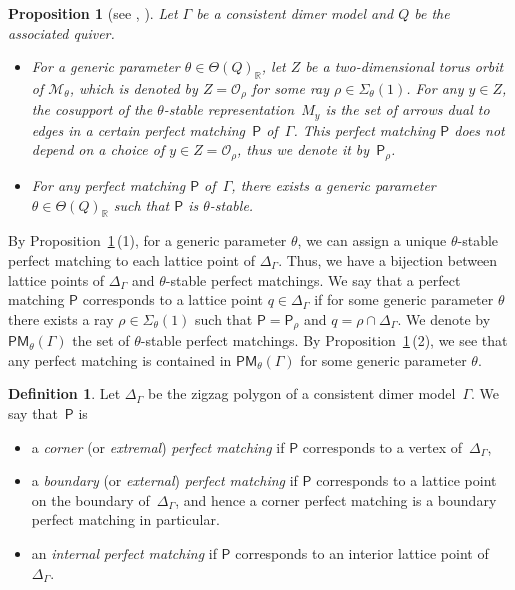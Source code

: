 \documentclass[10pt,a4paper]{amsart}
\numberwithin{equation}{section}
\newtheorem{Proposition}[Theorem]{Proposition}
\theoremstyle{definition}
\newtheorem{Definition}[Theorem]{Definition}
\newcommand{\RR}{\mathbb{R}}
\newcommand{\calM}{\mathcal{M}}
\newcommand{\calO}{\mathcal{O}}
\newcommand{\sfP}{\mathsf{P}}
\newcommand{\PM}{\mathsf{PM}}
\begin{document}
\begin{Proposition}[{see \cite[Section~6]{IU_moduli}, \cite[Proposition~4.15]{Moz}}]
\label{corresp_pm}
Let $\Gamma$ be a consistent dimer model and $Q$ be the associated quiver.
\begin{itemize}\itemsep=0pt
\item[$(1)$] For a generic parameter $\theta\in\Theta(Q)_\RR$,
let $Z$ be a two-dimensional torus orbit of $\calM_\theta$, which is denoted by $Z=\calO_\rho$ for some ray $\rho\in\Sigma_\theta(1)$.
For any $y\in Z$, the cosupport of the $\theta$-stable representation~$M_y$ is the set of arrows dual to edges in
a certain perfect matching~$\sfP$ of~$\Gamma$.
This perfect matching $\sfP$ does not depend on a choice of $y\in Z=\calO_\rho$, thus we denote it by~$\sfP_\rho$.
\item[$(2)$]
For any perfect matching $\sfP$ of~$\Gamma$, there exists a generic parameter $\theta\in\Theta(Q)_\RR$ such that $\sfP$ is $\theta$-stable.
\end{itemize}
\end{Proposition}

By Proposition~\ref{corresp_pm}\,(1), for a generic parameter $\theta$,
we can assign a unique $\theta$-stable perfect matching to each lattice point of $\Delta_\Gamma$.
Thus, we have a bijection between lattice points of $\Delta_\Gamma$ and $\theta$-stable perfect matchings.
We say that a perfect matching $\sfP$ corresponds to a lattice point $q\in\Delta_\Gamma$
if for some generic parameter $\theta$ there exists a ray $\rho\in\Sigma_\theta(1)$ such that $\sfP=\sfP_\rho$ and $q=\rho\cap \Delta_\Gamma$.
We denote by $\PM_\theta(\Gamma)$ the set of $\theta$-stable perfect matchings.
By Proposition~\ref{corresp_pm}\,(2), we see that any perfect matching is contained in $\PM_\theta(\Gamma)$ for some generic parameter $\theta$.

\begin{Definition}
Let $\Delta_\Gamma$ be the zigzag polygon of a consistent dimer model~$\Gamma$.
We say that~$\sfP$ is
\begin{itemize}\itemsep=0pt
\item a \emph{corner} (or \emph{extremal}) \emph{perfect matching} if $\sfP$ corresponds to a vertex of~$\Delta_\Gamma$,
\item a \emph{boundary} (or \emph{external}) \emph{perfect matching} if $\sfP$ corresponds to a lattice point on the boundary of~$\Delta_\Gamma$,
and hence a corner perfect matching is a boundary perfect matching in particular.
\item an \emph{internal} \emph{perfect matching} if $\sfP$ corresponds to an interior lattice point of~$\Delta_\Gamma$.
\end{itemize}
\end{Definition}
\end{document}
